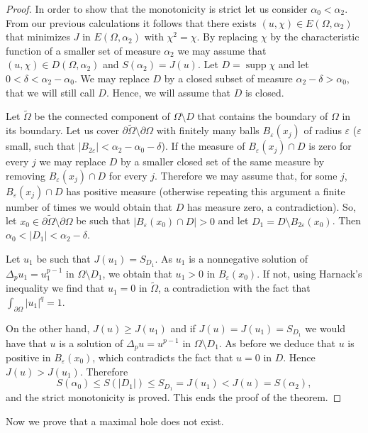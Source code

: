 \documentclass[11pt]{amsart}
\theoremstyle{remark}
\numberwithin{equation}{section}
\DeclareMathOperator{\supp}{supp}
\begin{document}
\begin{proof}
In order to show that the monotonicity is strict let us consider $\alpha_0<\alpha_2$. From our previous calculations it follows that there exists $(u,\chi)\in E(\Omega,\alpha_2)$ that minimizes $J$ in $E(\Omega,\alpha_2)$ with $\chi^2=\chi$. By replacing $\chi$ by the characteristic function of a smaller set of measure $\alpha_2$ we may assume that $(u,\chi)\in D(\Omega,\alpha_2)$ and $S(\alpha_2)=J(u)$. Let $D=\supp\chi$ and let $0<\delta<\alpha_2-\alpha_0$. We may replace $D$ by a closed subset of measure $\alpha_2-\delta>\alpha_0$, that we will still call $D$. Hence, we will assume that $D$ is closed.

Let $\tilde\Omega$ be the connected component of $\Omega\setminus D$ that contains the boundary of $\Omega$ in its boundary. Let us cover $\partial\tilde\Omega\setminus\partial\Omega$ with finitely many balls $B_\varepsilon(x_j)$ of radius $\varepsilon$ ($\varepsilon$ small, such that $|B_{2\varepsilon}|<\alpha_2-\alpha_0-\delta$). If the measure of $B_\varepsilon(x_j)\cap D$ is zero for every $j$ we may replace $D$ by a smaller closed set of the same measure by removing $B_\varepsilon(x_j)\cap D$ for every $j$. Therefore we may assume that, for some $j$, $B_\varepsilon(x_j)\cap D$ has positive measure (otherwise repeating this argument a finite number of times we would obtain that $D$ has measure zero, a contradiction). So, let $x_0\in\partial\tilde\Omega\setminus\partial\Omega$ be such that $|B_\varepsilon(x_0)\cap D|>0$ and let $D_1=D\setminus B_{2\varepsilon}(x_0)$. Then $\alpha_0<|D_1|<\alpha_2-\delta$.

Let $u_1$ be such that $J(u_1)=S_{D_1}$. As $u_1$ is a nonnegative solution of $\Delta_pu_1=u_1^{p-1}$ in $\Omega\setminus D_1$, we obtain that $u_1>0$ in $B_\varepsilon(x_0)$. If not, using Harnack's inequality we find that $u_1=0$ in $\tilde\Omega$, a contradiction with the fact that $\int_{\partial\Omega}|u_1|^q=1$.

On the other hand, $J(u)\ge J(u_1)$ and if $J(u)=J(u_1)=S_{D_1}$ we would have that $u$ is a solution of $\Delta_pu=u^{p-1}$ in $\Omega\setminus D_1$. As before we deduce that $u$ is positive in $B_\varepsilon(x_0)$, which contradicts the fact that $u=0$ in $D$. Hence $J(u)>J(u_1)$. Therefore
\[
S(\alpha_0)\le S(|D_1|)\le S_{D_1}=J(u_1)<J(u)=S(\alpha_2),
\]
and the strict monotonicity is proved. This ends the proof of the theorem.
\end{proof}

Now we prove that a maximal hole does not exist.
\end{document}
